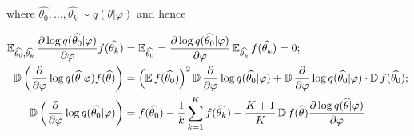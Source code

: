 where $\widehat{\theta_0}, \ldots, \widehat{\theta_k} \sim q(\theta | \varphi)$ and hence

\begin{equation*}
    \begin{aligned}
        \operatorname{\mathbb{E}}_{\widehat{\theta_0}, \widehat{\theta_k}} \frac{\partial \log q (\widehat{\theta_0} | \varphi)}{\partial \varphi} f(\widehat{\theta_k}) &= \operatorname{\mathbb{E}}_{\widehat{\theta_0}} = \frac{\partial \log q(\widehat{\theta_0} | \varphi)}{\partial \varphi} \operatorname{\mathbb{E}}_{\widehat{\theta_k}} f(\widehat{\theta_k}) = 0; \\ 
        \operatorname{\mathbb{D}} \left(\frac{\partial}{\partial \varphi} \log q(\widehat{\theta} | \varphi) f(\widehat{\theta})\right) &= \left( \operatorname{\mathbb{E}} f(\widehat{\theta_0}) \right)^2 \operatorname{\mathbb{D}} \frac{\partial}{\partial \varphi} \log q(\widehat{\theta_0} | \varphi) + \operatorname{\mathbb{D}} \frac{\partial}{\partial \varphi} \log q(\widehat{\theta_0} | \varphi) \cdot \operatorname{\mathbb{D}} f(\widehat{\theta_0}); \\ 
        \operatorname{\mathbb{D}} \left( \frac{\partial}{\partial \varphi} \log q(\widehat{\theta_0} | \varphi) \right) &= f(\widehat{\theta_0}) - \frac{1}{k} \sum_{k = 1}^K f(\widehat{\theta_k}) - \frac{K + 1}{K} \operatorname{\mathbb{D}} f(\widehat{\theta}) \frac{\partial \log q (\widehat{\theta} | \varphi)}{\partial \varphi}
    \end{aligned}
\end{equation*}




